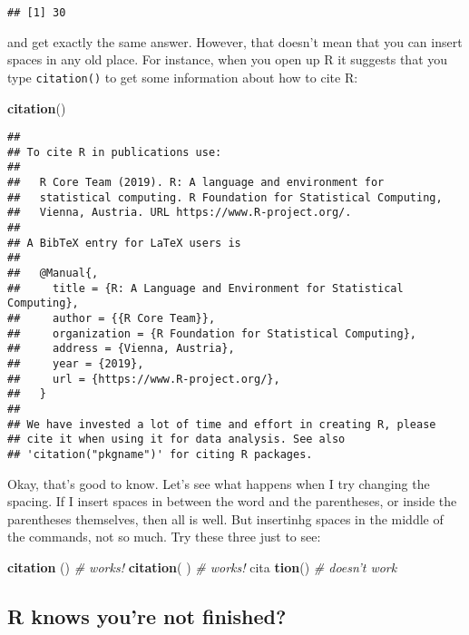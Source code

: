 \documentclass[]{book}
\newenvironment{Shaded}{\begin{snugshade}}{\end{snugshade}}
\newcommand{\CommentTok}[1]{\textcolor[rgb]{0.56,0.35,0.01}{\textit{#1}}}
\newcommand{\KeywordTok}[1]{\textcolor[rgb]{0.13,0.29,0.53}{\textbf{#1}}}
\newcommand{\NormalTok}[1]{#1}
\begin{document}
\begin{verbatim}
## [1] 30
\end{verbatim}

and get exactly the same answer. However, that doesn't mean that you can insert spaces in any old place. For instance, when you open up R it suggests that you type \texttt{citation()} to get some information about how to cite R:

\begin{Shaded}
\begin{Highlighting}[]
\KeywordTok{citation}\NormalTok{()}
\end{Highlighting}
\end{Shaded}

\begin{verbatim}
## 
## To cite R in publications use:
## 
##   R Core Team (2019). R: A language and environment for
##   statistical computing. R Foundation for Statistical Computing,
##   Vienna, Austria. URL https://www.R-project.org/.
## 
## A BibTeX entry for LaTeX users is
## 
##   @Manual{,
##     title = {R: A Language and Environment for Statistical Computing},
##     author = {{R Core Team}},
##     organization = {R Foundation for Statistical Computing},
##     address = {Vienna, Austria},
##     year = {2019},
##     url = {https://www.R-project.org/},
##   }
## 
## We have invested a lot of time and effort in creating R, please
## cite it when using it for data analysis. See also
## 'citation("pkgname")' for citing R packages.
\end{verbatim}

Okay, that's good to know. Let's see what happens when I try changing the spacing. If I insert spaces in between the word and the parentheses, or inside the parentheses themselves, then all is well. But insertinhg spaces in the middle of the commands, not so much. Try these three just to see:

\begin{Shaded}
\begin{Highlighting}[]
\KeywordTok{citation}\NormalTok{ ()     }\CommentTok{# works!}
\KeywordTok{citation}\NormalTok{(    )  }\CommentTok{# works!}
\NormalTok{cita }\KeywordTok{tion}\NormalTok{()     }\CommentTok{# doesn't work}
\end{Highlighting}
\end{Shaded}

\hypertarget{r-knows-youre-not-finished}{%
\subsection{R knows you're not finished?}\label{r-knows-youre-not-finished}}
\end{document}
